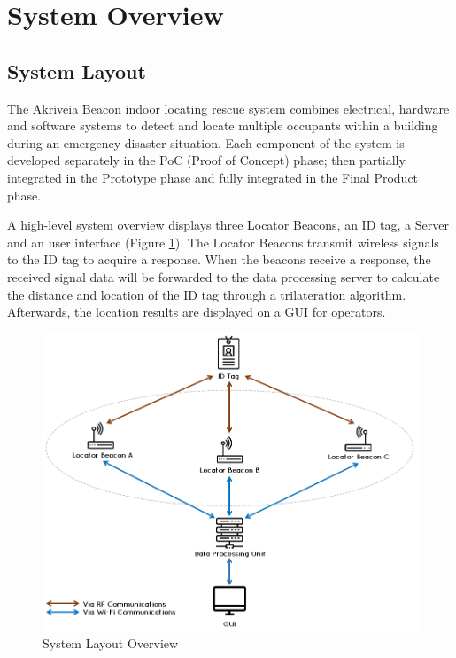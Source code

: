 

\setcounter{section}{1}
\section{System Overview}
\bigskip
\subsection{System Layout}
The Akriveia Beacon indoor locating rescue system combines electrical, hardware and software systems to detect and locate multiple occupants within a building during an emergency disaster situation. Each component of the system is developed separately in the PoC (Proof of Concept) phase; then partially integrated in the Prototype phase and fully integrated in the Final Product phase.

\bigskip
A high-level system overview displays three Locator Beacons, an ID tag, a Server and an user interface (Figure \ref{fig:system_layout}).
The Locator Beacons transmit wireless signals to the ID tag to acquire a response.
When the beacons receive a response, the received signal data will be forwarded to the data processing server to calculate the distance and location of the ID tag through a trilateration algorithm.
Afterwards, the location results are displayed on a \Gls{GUI} for operators.

\begin{figure}[h!]
    \centering
    \includegraphics[width=\linewidth]{./images/00_sys_arch.png}
    \caption{System Layout Overview}
    \label{fig:system_layout}
\end{figure}


